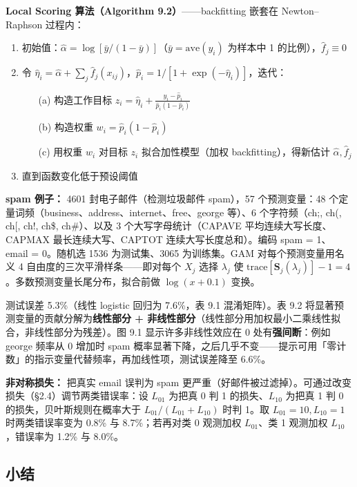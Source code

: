 \textbf{Local Scoring 算法（Algorithm 9.2）}——backfitting 嵌套在 Newton--Raphson 过程内：
\begin{enumerate}
    \item 初始值：$\hat\alpha = \log[\bar y / (1 - \bar y)]$（$\bar y = \mathrm{ave}(y_i)$ 为样本中 1 的比例），$\hat f_j \equiv 0$
    \item 令 $\hat\eta_i = \hat\alpha + \sum_j \hat f_j(x_{ij})$，$\hat p_i = 1/[1 + \exp(-\hat\eta_i)]$，迭代：
    \begin{enumerate}
        \item[(a)] 构造工作目标 $z_i = \hat\eta_i + \frac{y_i - \hat p_i}{\hat p_i(1 - \hat p_i)}$
        \item[(b)] 构造权重 $w_i = \hat p_i(1 - \hat p_i)$
        \item[(c)] 用权重 $w_i$ 对目标 $z_i$ 拟合加性模型（加权 backfitting），得新估计 $\hat\alpha, \hat f_j$
    \end{enumerate}
    \item 直到函数变化低于预设阈值
\end{enumerate}

\textbf{spam 例子：} 4601 封电子邮件（检测垃圾邮件 spam），57 个预测变量：48 个定量词频（business、address、internet、free、george 等）、6 个字符频（ch;, ch(, ch[, ch!, ch\$, ch\#）、以及 3 个大写字母统计（CAPAVE 平均连续大写长度、CAPMAX 最长连续大写、CAPTOT 连续大写长度总和）。编码 spam = 1、email = 0。随机选 1536 为测试集、3065 为训练集。GAM 对每个预测变量用名义 4 自由度的三次平滑样条——即对每个 $X_j$ 选择 $\lambda_j$ 使 $\mathrm{trace}[\mathbf{S}_j(\lambda_j)] - 1 = 4$。多数预测变量长尾分布，拟合前做 $\log(x + 0.1)$ 变换。

测试误差 5.3\%（线性 logistic 回归为 7.6\%，表 9.1 混淆矩阵）。表 9.2 将显著预测变量的贡献分解为\textbf{线性部分 + 非线性部分}（线性部分用加权最小二乘线性拟合，非线性部分为残差）。图 9.1 显示许多非线性效应在 0 处有\textbf{强间断}：例如 george 频率从 0 增加时 spam 概率显著下降，之后几乎不变——提示可用「零计数」的指示变量代替频率，再加线性项，测试误差降至 6.6\%。

\textbf{非对称损失：} 把真实 email 误判为 spam 更严重（好邮件被过滤掉）。可通过改变损失（§2.4）调节两类错误率：设 $L_{01}$ 为把真 0 判 1 的损失、$L_{10}$ 为把真 1 判 0 的损失，贝叶斯规则在概率大于 $L_{01}/(L_{01}+L_{10})$ 时判 1。取 $L_{01}=10, L_{10}=1$ 时两类错误率变为 0.8\% 与 8.7\%；若再对类 0 观测加权 $L_{01}$、类 1 观测加权 $L_{10}$，错误率为 1.2\% 与 8.0\%。

\subsection{小结}

